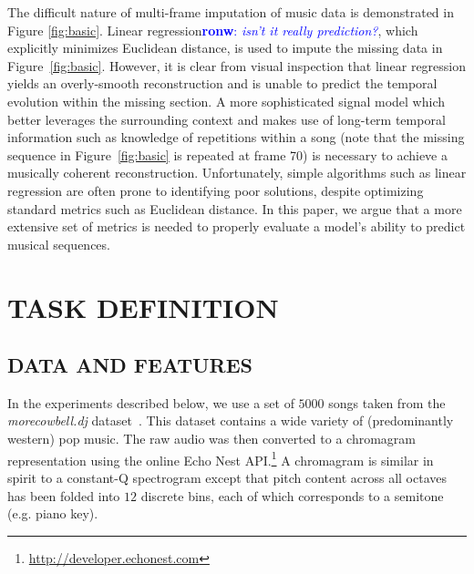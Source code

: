 \documentclass{article}
\newcommand{\FIXME}[2][FIXME]{\textcolor{blue}{\textbf{#1}: \emph{#2}}}
\begin{document}
The difficult nature of multi-frame imputation of music data is
demonstrated in Figure \ref{fig:basic}.
%
Linear regression\FIXME[ronw]{isn't it really prediction?}, which explicitly
minimizes Euclidean distance, is used to impute the missing data in
Figure~\ref{fig:basic}.  However, it is clear from visual inspection
that linear regression yields an overly-smooth reconstruction and is
unable to predict the temporal evolution within the missing section.
%
A more sophisticated signal model which better leverages the
surrounding context and makes use of long-term temporal information
such as knowledge of repetitions within a song (note that the
missing sequence in Figure~\ref{fig:basic} is repeated at frame 70) is necessary to achieve a musically
coherent reconstruction.
%
Unfortunately, simple algorithms such as linear regression
are often prone to identifying poor solutions, despite optimizing standard
metrics such as Euclidean distance.
%
In this paper, we argue that a more extensive set of metrics is needed
to properly evaluate a model's ability to predict musical sequences.


\section{TASK DEFINITION}
\label{sec:task}

\subsection{DATA AND FEATURES}
\label{ssec:feats}
In the experiments described below, we use a set of $5000$ songs taken
from the \emph{morecowbell.dj} dataset~\cite{Bertin-Mahieux2010a}.
This dataset contains a wide variety of (predominantly western) pop
music.  The raw audio was then converted to a chromagram
representation using the online Echo Nest
API.\footnote{\url{http://developer.echonest.com}} A chromagram is
similar in spirit to a constant-Q spectrogram except that pitch
content across all octaves has been folded into $12$ discrete bins,
each of which corresponds to a semitone (e.g. piano key).
%
\end{document}
